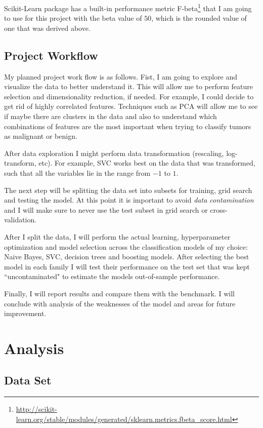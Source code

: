 \documentclass[10pt, a4paper]{article}
\begin{document}
Scikit-Learn package has a built-in performance metric F-beta\footnote{\scriptsize \url{http://scikit-learn.org/stable/modules/generated/sklearn.metrics.fbeta_score.html}} that I am going to use for this project with the beta value of $50$, which is the rounded value of one that was derived above.

\subsection{Project Workflow}

My planned project work flow is as follows. Fist, I am going to explore and visualize the data to better understand it. This will allow me to perform feature selection and dimensionality reduction, if needed. For example, I could decide to get rid of highly correlated features. Techniques such as PCA will allow me to see if maybe there are clusters in the data and also to understand which combinations of features are the most important when trying to classify tumors as malignant or benign.

After data exploration I might perform data transformation (rescaling, log-transform, etc). For example, SVC works best on the data that was transformed, such that all the variables lie in the range from $-1$ to $1$\cite{svm-guide}.

The next step will be splitting the data set into subsets for training, grid search and testing the model. At this point it is important to avoid \textit{data contamination} and I will make sure to never use the test subset in grid search or cross-validation.

After I split the data, I will perform the actual learning, hyperparameter optimization and model selection across the classification models of my choice: Naive Bayes, SVC, decision trees and boosting models. After selecting the best model in each family I will test their performance on the test set that was kept ``uncontaminated" to estimate the models out-of-sample performance.

Finally, I will report results and compare them with the benchmark. I will conclude with analysis of the weaknesses of the model and areas for future improvement.

\section{Analysis}

\subsection{Data Set}
\end{document}
